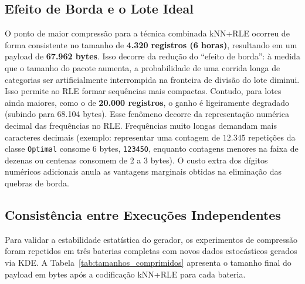 \documentclass[
	12pt,
	openright,
	oneside,
	a4paper,
	english,
	brazil
	]{abntex2}
\begin{document}
\subsection{Efeito de Borda e o Lote Ideal}
O ponto de maior compressão para a técnica combinada kNN+RLE ocorreu de forma consistente no tamanho de \textbf{4.320 registros (6 horas)}, resultando em um payload de \textbf{67.962 bytes}. Isso decorre da redução do ``efeito de borda'': à medida que o tamanho do pacote aumenta, a probabilidade de uma corrida longa de categorias ser artificialmente interrompida na fronteira de divisão do lote diminui. Isso permite ao RLE formar sequências mais compactas.
Contudo, para lotes ainda maiores, como o de \textbf{20.000 registros}, o ganho é ligeiramente degradado (subindo para 68.104 bytes). Esse fenômeno decorre da representação numérica decimal das frequências no RLE. Frequências muito longas demandam mais caracteres decimais (exemplo: representar uma contagem de $12.345$ repetições da classe \texttt{Optimal} consome 6 bytes, \texttt{12345O}, enquanto contagens menores na faixa de dezenas ou centenas consomem de 2 a 3 bytes). O custo extra dos dígitos numéricos adicionais anula as vantagens marginais obtidas na eliminação das quebras de borda.

\subsection{Consistência entre Execuções Independentes}
Para validar a estabilidade estatística do gerador, os experimentos de compressão foram repetidos em três baterias completas com novos dados estocásticos gerados via KDE. A Tabela~\ref{tab:tamanhos_comprimidos} apresenta o tamanho final do payload em bytes após a codificação kNN+RLE para cada bateria.

\begin{table}[H]
\centering
\caption{Tamanhos finais após compactação kNN+RLE (Bytes)}
\label{tab:tamanhos_comprimidos}
\end{table}
\end{document}
